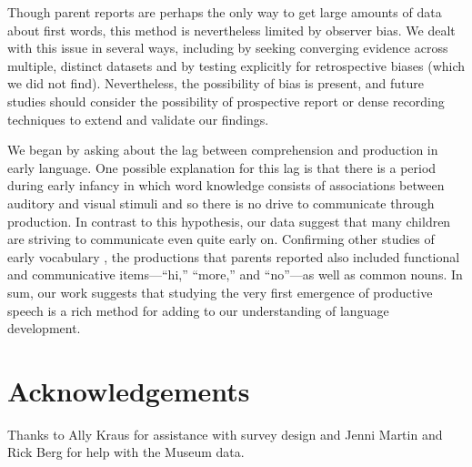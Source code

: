 \documentclass[10pt,letterpaper]{article}
\begin{document}
Though parent reports are perhaps the only way to get large amounts of data about first words, this method is nevertheless limited by observer bias. We dealt with this issue in several ways, including by seeking converging evidence across multiple, distinct datasets and by testing explicitly for retrospective biases (which we did not find). Nevertheless, the possibility of bias is present, and future studies should consider the possibility of prospective report or dense recording techniques to extend and validate our findings. 

We began by asking about the lag between comprehension and production in early language. One possible explanation for this lag is that there is a period during early infancy in which word knowledge consists of associations between auditory and visual stimuli and so there is no drive to communicate through production. In contrast to this hypothesis, our data suggest that many children are striving to communicate even quite early on. Confirming other studies of early vocabulary \cite{tardif2007}, the productions that parents reported also included functional and communicative items---``hi,'' ``more,'' and ``no''---as well as common nouns. In sum, our work suggests that studying the very first emergence of productive speech is a rich method for adding to our understanding of language development.

\section{Acknowledgements}

Thanks to Ally Kraus for assistance with survey design and Jenni Martin and Rick Berg for help with the Museum data.



\setlength{\bibleftmargin}{.125in}
\setlength{\bibindent}{-\bibleftmargin}


\end{document}
